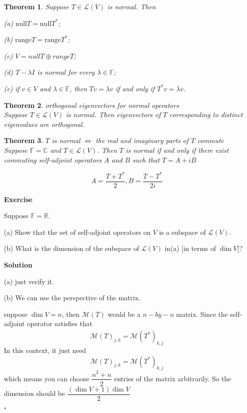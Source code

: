\documentclass{article}
\newtheorem{theorem}{Theorem}[subsection]
\newenvironment{exercise}{%
{\textbf{Exercise\\}
    }
}{
}
\newenvironment{solution}{%
{
    \textbf{Solution\\}
    }
}{
  \hfill $\square$ 
  \par\bigskip 
}
\newcommand{\RR}{\mathbb{R}}
\newcommand{\CC}{\mathbb{C}}
\newcommand{\FF}{\mathbb{F}}
\newcommand{\range}{\text{range}}
\newcommand{\n}{\text{null}}
\begin{document}
\begin{CJK}{UTF8}{gkai}
\begin{theorem}
    Suppose $T \in \mathcal{L}(V)$ is normal. Then

    (a) $\n T = \n T^\ast$;

    (b) $\range T = \range T^\ast$;

    (c) $V = nullT \oplus rangeT$;

    (d) $T - \lambda I$ is normal for every $\lambda \in \FF$;

    (e) if $v \in V$ and $\lambda \in \FF$, then $Tv = \lambda v$ if and only if $T^\ast v = \overline{\lambda }v$.
\end{theorem}

\begin{theorem}
    orthogonal eigenvectors for normal operators\\

    Suppose $T \in \mathcal{L}(V)$ is normal. Then eigenvectors of $T$ corresponding to distinct eigenvalues are orthogonal.
\end{theorem}

\begin{theorem}
    $T$ is normal $\Leftrightarrow$ the real and imaginary parts of $T$ commute\\

    Suppose $\FF = \CC$ and $T \in \mathcal{L}(V)$. Then $T$ is normal if and only if there exist commuting self-adjoint operators $A$ and $B$ such that $T =  A + iB$
\end{theorem}

\[A = \dfrac{T + T^\ast}{2}, B = \dfrac{T - T^\ast}{2i}\]

\begin{exercise}
    Suppose $\FF = \RR$.

    (a) Show that the set of self-adjoint operators on $V$ is a subspace of $\mathcal{L}(V)$.

    (b) What is the dimension of the subspace of $\mathcal{L}(V)$ in(a) [in terms of $\dim V$]?
\end{exercise}

\begin{solution}
    (a) just verify it.

    (b) We can use the perspective of the matrix.

    suppose $\dim V= n$, then $\mathcal{M}(T)$ would be a $n-by-n$ matrix. Since the self-adjoint operator satisfies that 
    \[\mathcal{M}(T)_{j,k} = \overline{\mathcal{M}(T^\ast)_{k,j}}\]
    In this context, it just need 
    \[\mathcal{M}(T)_{j,k} = \mathcal{M}(T^\ast)_{k,j}\]
    which means you can choose $\dfrac{n^2 + n}{2}$ entries of the matrix arbitrarily. So the dimension should be $\dfrac{(\dim V + 1)\dim V}{2}$
\end{solution}


\end{CJK}
\end{document}
